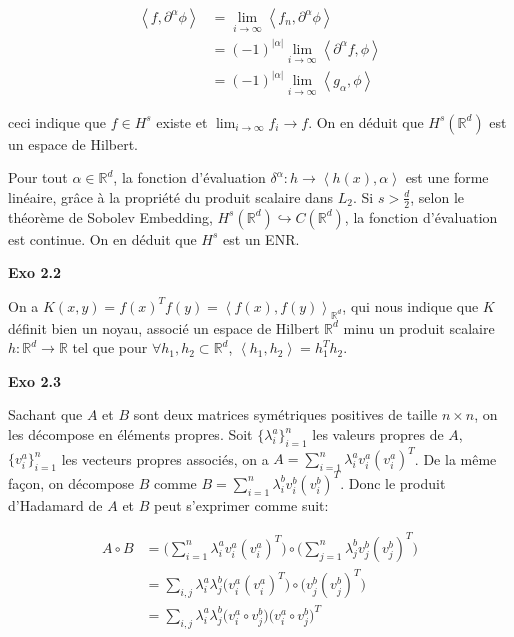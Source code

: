 \documentclass[11pt]{article}
\begin{document}
    \vspace{-4em}
    \begin{align*}
      \left \langle f, \partial^\alpha \phi \right \rangle &= \lim_{i\to \infty} \left \langle f_n, \partial^\alpha \phi \right \rangle \\
      &= (-1)^{|\alpha|} \lim_{i \to \infty} \left \langle \partial^\alpha f, \phi \right \rangle \\
      &=(-1)^{|\alpha|} \lim_{i \to \infty} \left \langle g_\alpha, \phi \right \rangle 
    \end{align*}
    \vspace{-5em}

    ceci indique que $f \in H^s$ existe et $\lim_{i \to \infty} f_i  \to f$. On en déduit que $H^s (\mathbb{R}^d)$ est un espace de Hilbert.

    Pour tout $\alpha \in \mathbb{R}^d$, la fonction d'évaluation $\delta^\alpha: h \to \left \langle h(x), \alpha \right \rangle$ est une forme linéaire, grâce à la propriété du produit scalaire dans $L_2$. Si $s > \frac{d}{2}$, selon le théorème de Sobolev Embedding, $H^s (\mathbb{R}^d) \hookrightarrow C(\mathbb{R}^d)$, la fonction d'évaluation est continue. On en déduit que $H^s$ est un ENR.

    \textbf{Exo 2.2}

    On a $K(x, y) = f(x)^T f(y) = \left \langle f(x), f(y) \right \rangle_{\mathbb{R}^d}$, qui nous indique que $K$ définit bien un noyau, associé un espace de Hilbert $\mathbb{R}^d$ minu un produit scalaire $h: \mathbb{R}^d \to \mathbb{R}$ tel que pour $\forall h_1, h_2 \subset \mathbb{R}^d$, $ \left \langle h_1, h_2 \right \rangle = h_1^T h_2$.

    \textbf{Exo 2.3}

    Sachant que $A$ et $B$ sont deux matrices symétriques positives de taille $n \times n$, on les décompose en éléments propres. Soit $\{\lambda_i^a\}_{i=1}^n$ les valeurs propres de $A$, $\{v_i^a\}_{i=1}^n$ les vecteurs propres associés, on a $A = \sum_{i=1}^n \lambda_i^a v_i^a (v_i^a)^T$. 
    De la même façon, on décompose $B$ comme $B = \sum_{i=1}^n \lambda_i^b v_i^b (v_i^b)^T$. Donc le produit d'Hadamard de $A$ et $B$ peut s'exprimer comme suit:

    \vspace{-4em}
    \begin{align*}
      A \circ B &= \Big (\sum_{i=1}^n \lambda_i^a v_i^a (v_i^a)^T \Big) \circ \Big (\sum_{j=1}^n \lambda_j^b v_j^b (v_j^b)^T \Big)\\
      &= \sum_{i, j} \lambda_i^a \lambda_j^b \Big ( v_i^a (v_i^a)^T \Big ) \circ \Big ( v_j^b (v_j^b)^T \Big ) \\
      &= \sum_{i, j} \lambda_i^a \lambda_j^b \Big ( v_i^a \circ v_j^b \Big ) \Big ( v_i^a \circ v_j^b \Big )^T \\ 
    \end{align*}
    \vspace{-7em}
\end{document}
